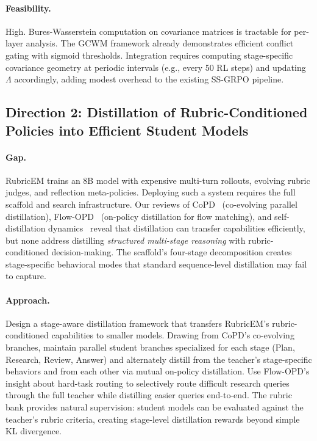 \documentclass[11pt,a4paper]{article}
\begin{document}
\paragraph{Feasibility.} High. Bures-Wasserstein computation on covariance matrices is tractable for per-layer analysis. The GCWM framework already demonstrates efficient conflict gating with sigmoid thresholds. Integration requires computing stage-specific covariance geometry at periodic intervals (e.g., every 50 RL steps) and updating $\Lambda$ accordingly, adding modest overhead to the existing SS-GRPO pipeline.

\subsection{Direction 2: Distillation of Rubric-Conditioned Policies into Efficient Student Models}

\paragraph{Gap.} RubricEM trains an 8B model with expensive multi-turn rollouts, evolving rubric judges, and reflection meta-policies. Deploying such a system requires the full scaffold and search infrastructure. Our reviews of CoPD~\cite{copd} (co-evolving parallel distillation), Flow-OPD~\cite{flowopd} (on-policy distillation for flow matching), and self-distillation dynamics~\cite{selfdistill} reveal that distillation can transfer capabilities efficiently, but none address distilling \textit{structured multi-stage reasoning} with rubric-conditioned decision-making. The scaffold's four-stage decomposition creates stage-specific behavioral modes that standard sequence-level distillation may fail to capture.

\paragraph{Approach.} Design a stage-aware distillation framework that transfers RubricEM's rubric-conditioned capabilities to smaller models. Drawing from CoPD's co-evolving branches, maintain parallel student branches specialized for each stage (Plan, Research, Review, Answer) and alternately distill from the teacher's stage-specific behaviors and from each other via mutual on-policy distillation. Use Flow-OPD's insight about hard-task routing to selectively route difficult research queries through the full teacher while distilling easier queries end-to-end. The rubric bank provides natural supervision: student models can be evaluated against the teacher's rubric criteria, creating stage-level distillation rewards beyond simple KL divergence.
\end{document}
